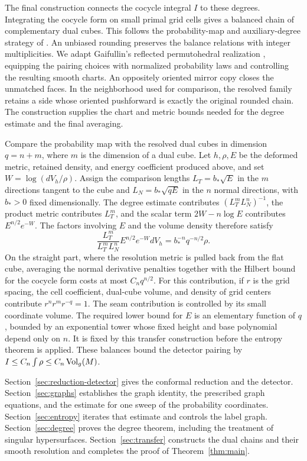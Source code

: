 The final construction connects the cocycle integral \(I\) to these
degrees. Integrating the cocycle form on small primal grid cells gives
a balanced chain of complementary dual cubes. This follows the
probability-map and auxiliary-degree strategy of
\cite[Section 3]{OpenAIScalarInessentiality2026}. An unbiased rounding
preserves the balance relations with integer multiplicities. We adapt
Gaifullin's reflected permutohedral realization
\cite{Gaifullin2008,Gaifullin2013}, equipping the pairing choices with
normalized probability laws and controlling the resulting smooth
charts. An oppositely oriented mirror copy closes the unmatched faces.
In the neighborhood used for comparison, the resolved family retains a
side whose oriented pushforward is exactly the original rounded chain.
The construction supplies the chart and metric bounds needed for the
degree estimate and the final averaging.

Compare the probability map with the resolved dual cubes in dimension
\(q=n+m\), where \(m\) is the dimension of a dual cube. Let
\(h,\rho,E\) be the deformed metric, retained density, and energy
coefficient produced above, and set \(W=\log(dV_h/\rho)\). Assign the
comparison lengths \(L_T=b_*\sqrt E\) in the \(m\) directions tangent
to the cube and \(L_N=b_*\sqrt{qE}\) in the \(n\) normal directions,
with \(b_*>0\) fixed dimensionally. The degree estimate contributes
\((L_T^mL_N^n)^{-1}\), the product metric contributes \(L_T^m\), and
the scalar term \(2W-n\log E\) contributes \(E^{n/2}e^{-W}\).
The factors involving \(E\) and the volume density therefore satisfy
\[
 \frac{L_T^m}{L_T^mL_N^n}E^{n/2}e^{-W}dV_h
   =b_*^{-n}q^{-n/2}\rho.
\]
On the straight part, where the resolution metric is pulled back from the
flat cube, averaging the normal derivative penalties together with the
Hilbert bound for the cocycle form costs at most \(C_nq^{n/2}\). For this
contribution, if \(r\) is the grid spacing, the cell coefficient,
dual-cube volume, and density of grid centers contribute
\(r^n r^m r^{-q}=1\). The seam contribution is controlled by its small
coordinate volume. The required lower bound for \(E\) is an elementary
function of \(q\), bounded by an exponential tower whose fixed height and
base polynomial depend only on \(n\). It is fixed by this transfer construction before
the entropy theorem is applied. These balances bound the detector pairing by
\(I\le C_n\int\rho\le C_n\operatorname{Vol}_g(M)\).

Section~\ref{sec:reduction-detector} gives the conformal reduction and the
detector. Section~\ref{sec:graphs} establishes the graph identity, the
prescribed graph equations, and the estimate for one sweep of the
probability coordinates. Section~\ref{sec:entropy} iterates that estimate and
controls the label graph. Section~\ref{sec:degree} proves the degree theorem,
including the treatment of singular hypersurfaces.
Section~\ref{sec:transfer} constructs the dual chains and their smooth
resolution and completes the proof of Theorem~\ref{thm:main}.
